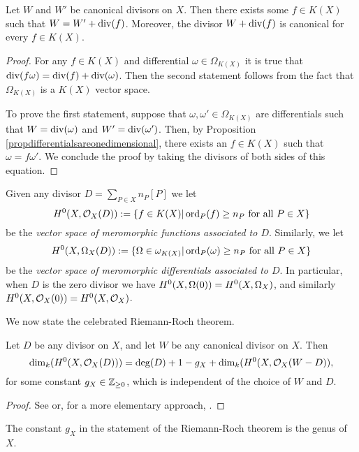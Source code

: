     \begin{thm}
    Let $W$ and $W'$ be canonical divisors on $X$.
    Then there exists some $f \in K(X)$ such that $W = W' + \operatorname{div}(f)$.
    Moreover, the divisor $W + \operatorname{div}(f)$ is canonical for every $f \in K(X)$.
    \end{thm}
    \begin{proof}
    For any $f \in K(X)$ and differential $\omega \in \Omega_{K(X)}$ it is true that $\operatorname{div}(f \omega) = \operatorname{div}(f) + \operatorname{div}(\omega)$.
    Then the second statement follows from the fact that $\Omega_{K(X)}$ is a $K(X)$ vector space.


    To prove the first statement, suppose that $\omega, \omega' \in \Omega_{K(X)}$ are differentials such that $W = \operatorname{div}(\omega)$ and $W' = \operatorname{div}(\omega')$.
    Then, by Proposition \ref{propdifferentialsareonedimensional}, there exists an $f \in K(X)$ such that $\omega = f \omega'$.
    We conclude the proof by taking the divisors of both sides of this equation.
    \end{proof}

Given any divisor $D = \sum_{P \in X} n_P[P]$ we let
    \[
    H^0(X,{\cal O}_X(D)) : = \{ f \in K(X) | \operatorname{ord}_P(f) \geq n_P\ \text{for all}\ P \in X\}
    \]
be the \emph{vector space of meromorphic functions associated to $D$}.
Similarly, we let 
    \[
    H^0(X,\Omega_X(D)) :  = \{ \Omega \in \omega_{K(X)} | \ord_P(\omega) \geq n_P \ \text{for all} \ P \in X\}
    \]
be the \emph{vector space of meromorphic differentials associated to $D$}.
In particular, when $D$ is the zero divisor we have $H^0(X,\Omega(0)) = {H^0(X,\Omega_X)}$, and similarly $H^0(X,{\cal O}_X(0)) = H^0(X,{\cal O}_X)$.

We now state the celebrated Riemann-Roch theorem.

    \begin{thm}\label{theoremriemannroch}
    Let $D$ be any divisor on $X$, and let $W$ be any canonical divisor on $X$.
    Then
        \[
        \dim_k(H^0(X,{\cal O}_X(D))) = \deg(D) + 1 - g_X + \dim_k(H^0(X,{\cal O}_X(W-D)), 
        \]
    for some constant $g_X \in {\mathbb Z}_{\geq 0}$, which is independent of the choice of $W$ and $D$.
    \end{thm}
    \begin{proof}
    See \cite[Chap.\ IV, \S 1, Thm.\ 1.3]{hart} or, for a more elementary approach, \cite[Chap.\ 8, \S 6]{fulton}.
    \end{proof}

    \begin{defn}
    The constant $g_X$ in the statement of the Riemann-Roch theorem is the genus of $X$.
    \end{defn}

